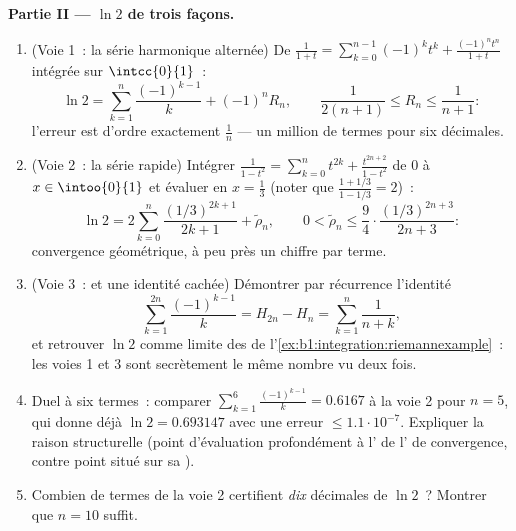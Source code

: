 \begin{problem}
\medskip
\noindent\textbf{Partie II --- $\ln 2$ de trois façons.}
\begin{enumerate}[resume]
  \item (Voie 1~: la série harmonique alternée) De $\frac{1}{1+t} =
        \sum_{k=0}^{n-1}(-1)^k t^k + \frac{(-1)^n t^n}{1+t}$
        intégrée sur $\intcc{0}{1}$~:
        \[
        \ln 2 = \sum_{k=1}^{n} \frac{(-1)^{k-1}}{k} + (-1)^n
        R_n, \qquad \frac{1}{2(n+1)} \leq R_n \leq
        \frac{1}{n+1} :
        \]
        l'erreur est d'ordre exactement $\frac 1n$ --- un million
        de termes pour six décimales.
  \item (Voie 2~: la série rapide) Intégrer $\frac{1}{1 - t^2} =
        \sum_{k=0}^{n} t^{2k} + \frac{t^{2n+2}}{1-t^2}$ de $0$
        à $x \in \intoo{0}{1}$ et évaluer en $x = \frac13$
        (noter que $\frac{1 + 1/3}{1 - 1/3} = 2$)~:
        \[
        \ln 2 = 2\sum_{k=0}^{n} \frac{(1/3)^{2k+1}}{2k+1} +
        \tilde\rho_n,
        \qquad
        0 < \tilde\rho_n \leq \frac{9}{4}\cdot
        \frac{(1/3)^{2n+3}}{2n+3} :
        \]
        convergence géométrique, à peu près un chiffre par terme.
  \item (Voie 3~:  et une identité cachée)
        Démontrer par récurrence l'identité
        \[
        \sum_{k=1}^{2n} \frac{(-1)^{k-1}}{k} = H_{2n} - H_n =
        \sum_{k=1}^{n} \frac{1}{n + k} ,
        \]
        et retrouver $\ln 2$ comme limite des  de
        l'\cref{ex:b1:integration:riemannexample}~: les voies 1 et 3
        sont secrètement le même nombre vu deux fois.
  \item Duel à six termes~: comparer $\sum_{k=1}^{6}
        \frac{(-1)^{k-1}}{k} = 0.6167$ à la voie 2 pour $n = 5$,
        qui donne déjà $\ln 2 = 0.693147$ avec une erreur $\leq
        1.1\cdot10^{-7}$. Expliquer la raison structurelle (point
        d'évaluation profondément à l' de l' de
        convergence, contre point situé sur sa ).
  \item Combien de termes de la voie 2 certifient \emph{dix}
        décimales de $\ln 2$~? Montrer que $n = 10$ suffit.
\end{enumerate}


\end{problem}
